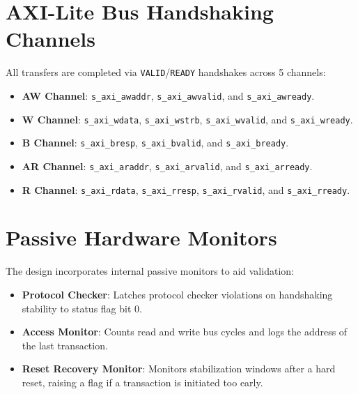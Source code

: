 \documentclass[11pt]{article}
\begin{document}
\section{AXI-Lite Bus Handshaking Channels}
All transfers are completed via \texttt{VALID}/\texttt{READY} handshakes across 5 channels:
\begin{itemize}
    \item \textbf{AW Channel}: \texttt{s\_axi\_awaddr}, \texttt{s\_axi\_awvalid}, and \texttt{s\_axi\_awready}.
    \item \textbf{W Channel}: \texttt{s\_axi\_wdata}, \texttt{s\_axi\_wstrb}, \texttt{s\_axi\_wvalid}, and \texttt{s\_axi\_wready}.
    \item \textbf{B Channel}: \texttt{s\_axi\_bresp}, \texttt{s\_axi\_bvalid}, and \texttt{s\_axi\_bready}.
    \item \textbf{AR Channel}: \texttt{s\_axi\_araddr}, \texttt{s\_axi\_arvalid}, and \texttt{s\_axi\_arready}.
    \item \textbf{R Channel}: \texttt{s\_axi\_rdata}, \texttt{s\_axi\_rresp}, \texttt{s\_axi\_rvalid}, and \texttt{s\_axi\_rready}.
\end{itemize}

\section{Passive Hardware Monitors}
The design incorporates internal passive monitors to aid validation:
\begin{itemize}
    \item \textbf{Protocol Checker}: Latches protocol checker violations on handshaking stability to status flag bit 0.
    \item \textbf{Access Monitor}: Counts read and write bus cycles and logs the address of the last transaction.
    \item \textbf{Reset Recovery Monitor}: Monitors stabilization windows after a hard reset, raising a flag if a transaction is initiated too early.
\end{itemize}
\end{document}
